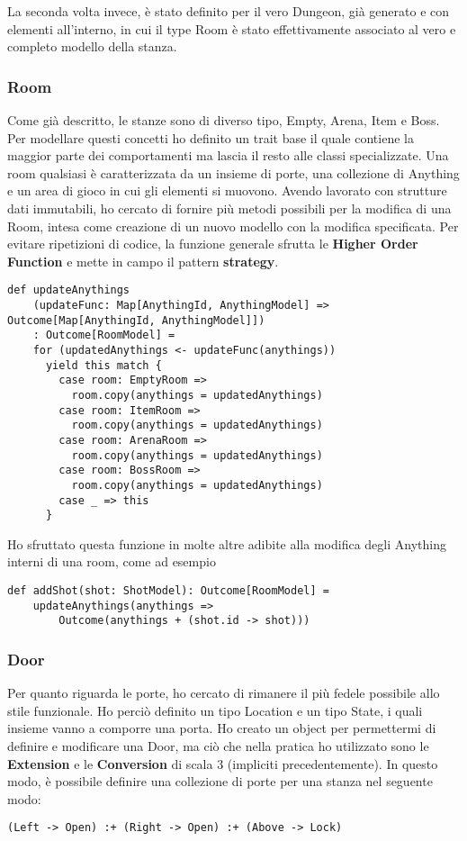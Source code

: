 La seconda volta invece, è stato definito per il vero Dungeon, già generato e con elementi all'interno, in cui il type Room è stato effettivamente associato al vero e completo modello della stanza.

\subsubsection{Room}
Come già descritto, le stanze sono di diverso tipo, Empty, Arena, Item e Boss. Per modellare questi concetti ho definito un trait base il quale contiene la maggior parte dei comportamenti ma lascia il resto alle classi specializzate. 
Una room qualsiasi è caratterizzata da un insieme di porte, una collezione di Anything e un area di gioco in cui gli elementi si muovono. 
Avendo lavorato con strutture dati immutabili, ho cercato di fornire più metodi possibili per la modifica di una Room, intesa come creazione di un nuovo modello con la modifica specificata. Per evitare ripetizioni di codice, la funzione generale sfrutta le \textbf{Higher Order Function} e mette in campo il pattern \textbf{strategy}. 
\begin{lstlisting}[basicstyle=\tiny]
    def updateAnythings
    (updateFunc: Map[AnythingId, AnythingModel] => Outcome[Map[AnythingId, AnythingModel]])
    : Outcome[RoomModel] =
    for (updatedAnythings <- updateFunc(anythings))
      yield this match {
        case room: EmptyRoom =>
          room.copy(anythings = updatedAnythings)
        case room: ItemRoom =>
          room.copy(anythings = updatedAnythings)
        case room: ArenaRoom =>
          room.copy(anythings = updatedAnythings)
        case room: BossRoom =>
          room.copy(anythings = updatedAnythings)
        case _ => this
      }
\end{lstlisting}

Ho sfruttato questa funzione in molte altre adibite alla modifica degli Anything interni di una room, come ad esempio 
\begin{lstlisting}[basicstyle=\tiny]
  def addShot(shot: ShotModel): Outcome[RoomModel] =
    updateAnythings(anythings => 
        Outcome(anythings + (shot.id -> shot)))
\end{lstlisting}

\subsubsection{Door}
Per quanto riguarda le porte, ho cercato di rimanere il più fedele possibile allo stile funzionale. Ho perciò definito un tipo Location e un tipo State, i quali insieme vanno a comporre una porta.
Ho creato un object per permettermi di definire e modificare una Door, ma ciò che nella pratica ho utilizzato sono le \textbf{Extension} e le \textbf{Conversion} di scala 3 (impliciti precedentemente).
In questo modo, è possibile definire una collezione di porte per una stanza nel seguente modo: 
\begin{lstlisting}[basicstyle=\tiny]
    (Left -> Open) :+ (Right -> Open) :+ (Above -> Lock)
\end{lstlisting}

